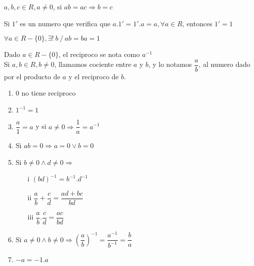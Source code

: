 \documentclass[10pt]{article}
\begin{document}
\begin{theo}{}
$a,b,c \in R, a \not = 0$, si $ab=ac \Rightarrow b=c$
\end{theo}

\begin{cor}{}
Si $1'$ es un numero que verifica que $a.1' = 1'.a = a, \forall a \in R$, entonces $1'=1$
\end{cor}

\begin{cor}{}
$\forall a \in R-\{0\}, \exists!\ b\ /\ ab = ba = 1$
\end{cor}

\begin{data}
Dado $a \in R-\{0\}$, el reciproco se nota como $a^{-1}$\\

Si $a,b \in R, b \not = 0$, llamamos cociente entre $a$ y $b$, y lo notamos $\dfrac{a}{b}$, al numero dado por el producto de $a$ y el reciproco de $b$. 
\end{data}

\newpage

\begin{theo}[]{}
\begin{multicols}{2}
\begin{enumerate}
\item $0$ no tiene reciproco
\item $1^{-1} = 1$
\item $\dfrac{a}{1}=a$ y si $a \not = 0 \Rightarrow \dfrac{1}{a}=a^{-1}$
\item Si $ab=0 \Rightarrow a=0 \lor b=0$
\item Si $b \not = 0 \land d \not = 0 \Rightarrow$
\begin{enumerate}
\item [i] $(bd)^{-1} = b^{-1}.d^{-1}$
\item [ii] $\dfrac{a}{b} + \dfrac{c}{d} = \dfrac{ad+bc}{bd}$
\item [iii] $\dfrac{a}{b} . \dfrac{c}{d} = \dfrac{ac}{bd}$
\end{enumerate}
\item Si $a \not = 0 \land b \not = 0 \Rightarrow \left(\dfrac{a}{b}\right)^{-1} = \dfrac{a^{-1}}{b^{-1}} = \dfrac{b}{a}$
\item $-a = -1. a$
\end{enumerate}
\end{multicols}
\end{theo}
\end{document}
